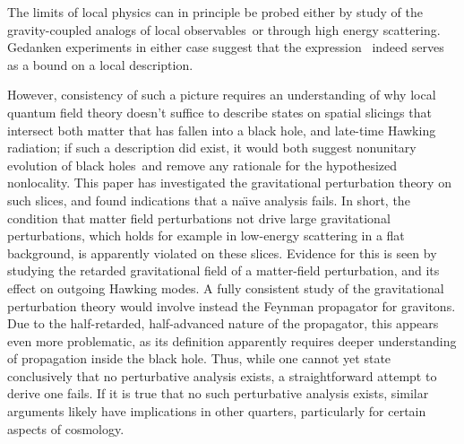 The limits of local physics can in principle be probed either by study of the gravity-coupled analogs of local observables\GMH\ or through high energy scattering.  Gedanken experiments in either case suggest that the expression \gravbd\ indeed serves as a bound on a local description.  

However, consistency of such a picture requires an understanding of why local quantum field theory doesn't suffice to describe states on spatial slicings that intersect both matter that has fallen into a black hole, and late-time Hawking radiation; if such a description did exist, it would both suggest nonunitary evolution of black holes\Hawkunc\ and remove any rationale for the hypothesized nonlocality.  This paper has investigated the gravitational perturbation theory on such slices, and found indications that a na\"\i ve analysis fails.  In short, the condition that matter field perturbations not drive large gravitational perturbations, which holds for example in low-energy scattering in a flat background, is apparently violated on these slices.  Evidence for this is seen by studying the retarded gravitational field of a matter-field perturbation, and its effect on outgoing Hawking modes.   A fully consistent study of the gravitational perturbation theory would involve instead the Feynman propagator for gravitons.  Due to the half-retarded, half-advanced nature of the propagator, this appears even more problematic, as its definition apparently requires deeper understanding of propagation inside the black hole.  Thus, while one cannot yet state conclusively that no perturbative analysis exists, a straightforward attempt to derive one fails. If it is true that no such perturbative analysis exists, similar arguments likely have implications in other quarters, particularly for certain aspects of cosmology.

 


